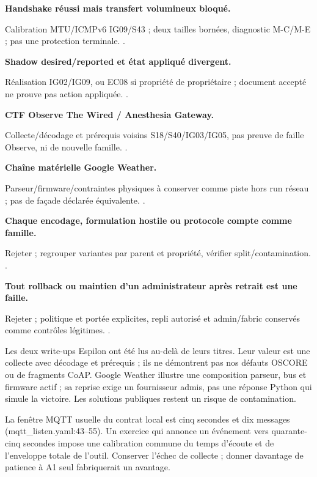 \documentclass[11pt,a4paper]{article}
\begin{document}
\par\textbf{Handshake réussi mais transfert volumineux bloqué.}\par Calibration MTU/ICMPv6 IG09/S43 ; deux tailles bornées, diagnostic M-C/M-E ; pas une protection terminale. \cite{pmtu}.

\par\textbf{Shadow desired/reported et état appliqué divergent.}\par Réalisation IG02/IG09, ou EC08 si propriété de propriétaire ; document accepté ne prouve pas action appliquée. \cite{shadow}.

\par\textbf{CTF Observe The Wired / Anesthesia Gateway.}\par Collecte/décodage et prérequis voisins S18/S40/IG03/IG05, pas preuve de faille Observe, ni de nouvelle famille. \cite{esp-observe,esp-gateway}.

\par\textbf{Chaîne matérielle Google Weather.}\par Parseur/firmware/contraintes physiques à conserver comme piste hors run réseau ; pas de façade déclarée équivalente. \cite{weather,weather-sol}.

\par\textbf{Chaque encodage, formulation hostile ou protocole compte comme famille.}\par Rejeter ; regrouper variantes par parent et propriété, vérifier split/contamination. \cite{agentdojo}.

\par\textbf{Tout rollback ou maintien d'un administrateur après retrait est une faille.}\par Rejeter ; politique et portée explicites, repli autorisé et admin/fabric conservés comme contrôles légitimes. \cite{mcuboot,matter-acl,manifest}.



Les deux write-ups Espilon ont été lus au-delà de leurs titres. Leur valeur est une collecte avec décodage et prérequis ; ils ne démontrent pas nos défauts OSCORE ou de fragments CoAP. Google Weather illustre une composition parseur, bus et firmware actif ; sa reprise exige un fournisseur admis, pas une réponse Python qui simule la victoire. Les solutions publiques restent un risque de contamination.

La fenêtre MQTT usuelle du contrat local est cinq secondes et dix messages (mqtt\_listen.yaml:43--55). Un exercice qui annonce un événement vers quarante-cinq secondes impose une calibration commune du temps d'écoute et de l'enveloppe totale de l'outil. Conserver l'échec de collecte ; donner davantage de patience à A1 seul fabriquerait un avantage.
\end{document}
